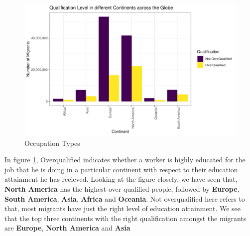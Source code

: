 \documentclass[11pt,a4paper,]{article}
\begin{document}
\begin{figure}
\centering
\includegraphics{ETC5513assignment4_files/figure-latex/qual-1.pdf}
\caption{\label{fig:qual}Occupation Types}
\end{figure}

In figure \ref{fig:qual}, Overqualified indicates whether a worker is highly educated for the job that he is doing in a particular continent with respect to their education attainment he has recieved. Looking at the figure closely, we have seen that, \textbf{North America} has the highest over qualified people, followed by \textbf{Europe}, \textbf{South America}, \textbf{Asia}, \textbf{Africa} and \textbf{Oceania}. Not overqualified here refers to that, most migrants have just the right level of education attainment. We see that the top three continents with the right qualification amongst the migrants are \textbf{Europe}, \textbf{North America} and \textbf{Asia}
\end{document}
